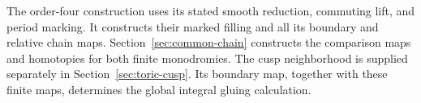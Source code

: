 The order-four construction uses its stated smooth reduction, commuting
lift, and period marking. It constructs their marked filling and all its
boundary and relative chain maps. Section~\ref{sec:common-chain}
constructs the comparison maps and homotopies for both finite
monodromies. The cusp neighborhood is supplied separately in
Section~\ref{sec:toric-cusp}. Its boundary map, together with these
finite maps, determines the global integral gluing calculation.
